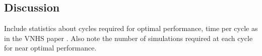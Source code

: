 \documentclass[paper=a4, fontsize=11pt]{scrartcl} %
\numberwithin{equation}{section} %
\numberwithin{figure}{section} %
\numberwithin{table}{section} %
\begin{document}
%


\subsection{Discussion}

Include statistics about cycles required for optimal performance, time per cycle as in the VNHS paper \cite{VNHS09}. Also note the number of simulations required at each cycle for near optimal performance.




\end{document}
